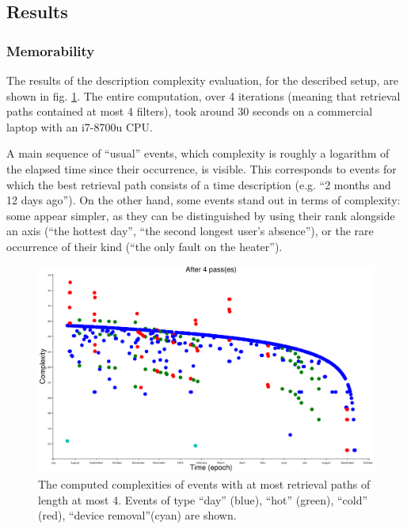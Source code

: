 \documentclass[conference]{IEEEtran}
\begin{document}
\subsection{Results}

\subsubsection{Memorability}

The results of the description complexity evaluation, for the described setup,
are shown in fig. \ref{fig:computed_cplx}. The entire computation, over 4
iterations (meaning that retrieval paths contained at most 4 filters), took
around 30 seconds on a commercial laptop with an i7-8700u CPU.

A main sequence of ``usual'' events, which complexity is roughly a logarithm of
the elapsed time since their occurrence, is visible. This corresponds to events
for which the best retrieval path consists of a time description (e.g. ``2
months and 12 days ago''). On the other hand, some events stand out in terms of
complexity: some appear simpler, as they can be distinguished by using their
rank alongside an axis (``the hottest day'', ``the second longest user's
absence''), or the rare occurrence of their kind (``the only fault on the heater'').

\begin{figure}[ht]
  \centering
  \includegraphics[width=\linewidth]{figures/complexities_computed}
  \caption{The computed complexities of events with at most retrieval paths of
    length at most 4. Events of type ``day'' (blue), ``hot'' (green), ``cold''
    (red), ``device removal''(cyan) are shown.}
  \label{fig:computed_cplx}
\end{figure}
\end{document}
